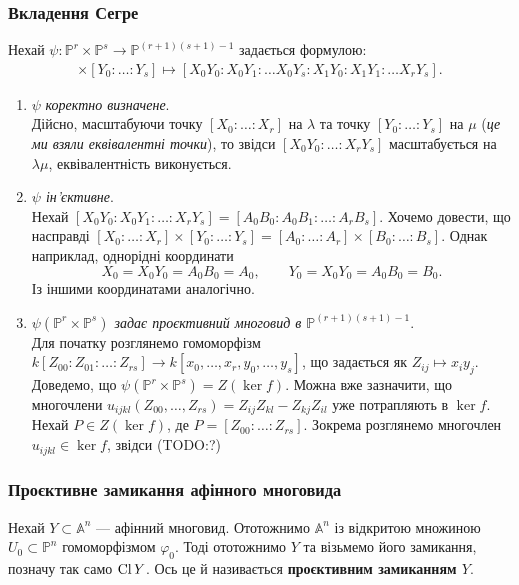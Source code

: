 \documentclass{math_library}
\begin{document}
\subsubsection{Вкладення Сегре}
Нехай $\psi \colon \mathbb{P}^r \times \mathbb{P}^s \to \mathbb{P}^{(r+1)(s+1)-1}$ задається формулою:
\begin{align*}
[X_0: \ldots :X_r] \times [Y_0: \ldots : Y_s] \mapsto [X_0Y_0: X_0Y_1: \dots X_0Y_s: X_1Y_0: X_1Y_1: \dots X_rY_s].
\end{align*}
\begin{enumerate}[wide=0pt,label={\Roman*.}]
\item $\psi$ \textit{коректно визначене}.\\
Дійсно, масштабуючи точку $[X_0:\ldots:X_r]$ на $\lambda$ та точку $[Y_0:\ldots:Y_s]$ на $\mu$ (\textit{це ми взяли еквівалентні точки}), то звідси $[X_0Y_0: \ldots: X_r Y_s]$ масштабується на $\lambda \mu$, еквівалентність виконується.

\item \textit{$\psi$ ін'єктивне}.\\
Нехай $[X_0Y_0:X_0Y_1:\ldots:X_rY_s] = [A_0B_0:A_0B_1:\ldots:A_rB_s]$. Хочемо довести, що насправді $[X_0:\ldots:X_r] \times [Y_0:\ldots:Y_s] = [A_0:\ldots:A_r] \times [B_0:\ldots:B_s]$. Однак наприклад, однорідні координати
\[
X_0 = X_0 Y_0 = A_0 B_0 = A_0, \qquad Y_0 = X_0 Y_0 = A_0 B_0 = B_0.
\]
Із іншими координатами аналогічно.

\item \textit{$\psi(\mathbb{P}^r \times \mathbb{P}^s)$ задає проєктивний многовид в $\mathbb{P}^{(r+1)(s+1)-1}$}.\\
Для початку розглянемо гомоморфізм $k[Z_{00}: Z_{01}: \ldots : Z_{rs}] \to k[x_0,\dots,x_r,y_0,\dots,y_s]$, що задається як $Z_{ij} \mapsto x_i y_j$. Доведемо, що $\psi(\mathbb{P}^r \times \mathbb{P}^s) = Z(\ker f)$. Можна вже зазначити, що многочлени $u_{ijkl}(Z_{00},\dots,Z_{rs}) = Z_{ij} Z_{kl} - Z_{kj} Z_{il}$ уже потрапляють в $\ker f$.\\
Нехай $P \in Z(\ker f)$, де $P = [Z_{00}: \ldots: Z_{rs}]$. Зокрема розглянемо многочлен $u_{ijkl} \in \ker f$, звідси (TODO:?)
\end{enumerate}

\subsubsection{Проєктивне замикання афінного многовида}
\begin{definition}
Нехай $Y \subset \mathbb{A}^n$ --- афінний многовид. Ототожнимо $\mathbb{A}^n$ із відкритою множиною $U_0 \subset \mathbb{P}^n$ гомоморфізмом $\varphi_0$. Тоді ототожнимо $Y$ та візьмемо його замикання, позначу так само $\operatorname{Cl} Y$. Ось це й називається \textbf{проєктивним замиканням $Y$}.
\end{definition}
\end{document}

